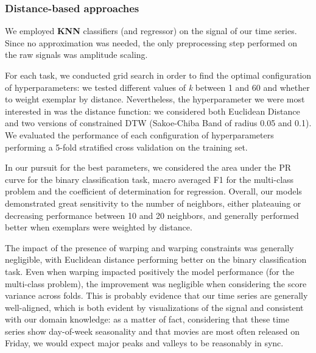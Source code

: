\begin{table}
    \caption{Performance of tested model for the regression task.}\label{tab:ts_regression_cv_performance}
\end{table}

\subsubsection{Distance-based approaches}\label{sec:tsclass_distance}
We employed \textbf{KNN} classifiers (and regressor) on the signal of our time series. Since no approximation was needed, the only preprocessing step performed on the raw signals was amplitude scaling.

For each task, we conducted grid search in order to find the optimal configuration of hyperparameters: we tested different values of \emph{k} between 1 and 60 and whether to weight exemplar by distance.
Nevertheless, the hyperparameter we were most interested in was the distance function: we considered both Euclidean Distance and two versions of constrained DTW (Sakoe-Chiba Band of radius 0.05 and 0.1).
We evaluated the performance of each configuration of hyperparameters performing a 5-fold stratified cross validation on the training set.

In our pursuit for the best parameters, we considered the area under the PR curve for the binary classification task, macro averaged F1 for the multi-class problem and the coefficient of determination for regression.
Overall, our models demonstrated great sensitivity to the number of neighbors, either plateauing or decreasing performance between 10 and 20 neighbors, and generally performed better when exemplars were weighted by distance.

The impact of the presence of warping and warping constraints was generally negligible, with Euclidean distance performing better on the binary classification task.
Even when warping impacted positively the model performance (for the multi-class problem), the improvement was negligible when considering the score variance across folds.
This is probably evidence that our time series are generally well-aligned, which is both evident by visualizations of the signal and consistent with our domain knowledge: as a matter of fact, considering that these time series show day-of-week seasonality and that movies are most often released on Friday, we would expect major peaks and valleys to be reasonably in sync.

